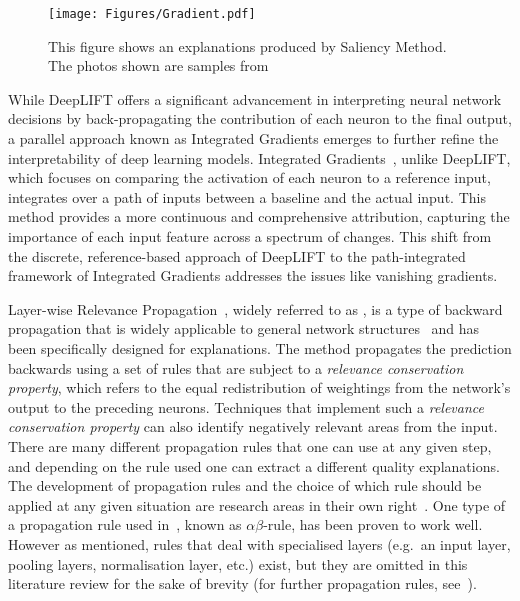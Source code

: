 \begin{figure}[ht!]
	\begin{center}
		\texttt{[image: Figures/Gradient.pdf]}
	\end{center}
	\caption{This figure shows an explanations produced by Saliency Method. The photos shown are samples from~\cite{SimonyanVZ13}}
	\label{Fig:VAE}
\end{figure} 


While DeepLIFT offers a significant advancement in interpreting neural network decisions by back-propagating the contribution of each neuron to the final output, a parallel approach known as Integrated Gradients emerges to further refine the interpretability of deep learning models. Integrated Gradients~\cite{SundararajanTY17}, unlike DeepLIFT, which focuses on comparing the activation of each neuron to a reference input, integrates over a path of inputs between a baseline and the actual input. This method provides a more continuous and comprehensive attribution, capturing the importance of each input feature across a spectrum of changes. This shift from the discrete, reference-based approach of DeepLIFT to the path-integrated framework of Integrated Gradients addresses the issues like vanishing gradients.

Layer-wise Relevance Propagation~\cite{bach2015pixel}, widely referred to as \LRP, is a type of backward propagation that is widely applicable to general network structures~\cite{LapuschkinBMMS16} and has been specifically designed for explanations. The method propagates the prediction backwards using a set of rules that are subject to a \textit{relevance conservation property}, which refers to the equal redistribution of weightings from the network's output to the preceding neurons. Techniques that implement such a \textit{relevance conservation property} can also identify negatively relevant areas from the input. There are many different \LRP\/ propagation rules that one can use at any given step, and depending on the rule used one can extract a different quality explanations. The development of propagation rules and the choice of which rule should be applied at any given situation are research areas in their own right~\cite{MontavonLBSM17}. One type of a \LRP\/ propagation rule used in~\cite{bach2015pixel}, known as $\alpha\beta$-rule, has been proven to work well. However as mentioned, rules that deal with specialised layers (e.g.\ an input layer, pooling layers, normalisation layer, etc.) exist, but they are omitted in this literature review for the sake of brevity (for further propagation rules, see~\cite{MontavonLBSM17}).



